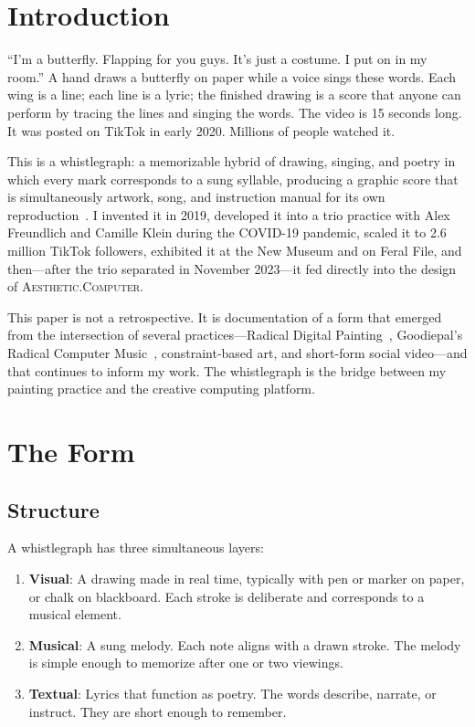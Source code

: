 \documentclass[10pt,letterpaper,twocolumn]{article}
\newcommand{\ac}{\textsc{Aesthetic.Computer}}
\begin{document}
\section{Introduction}

``I'm a butterfly. Flapping for you guys. It's just a costume. I put on in my room.'' A hand draws a butterfly on paper while a voice sings these words. Each wing is a line; each line is a lyric; the finished drawing is a score that anyone can perform by tracing the lines and singing the words. The video is 15 seconds long. It was posted on TikTok in early 2020. Millions of people watched it.

This is a whistlegraph: a memorizable hybrid of drawing, singing, and poetry in which every mark corresponds to a sung syllable, producing a graphic score that is simultaneously artwork, song, and instruction manual for its own reproduction~\citep{dirt2023whistlegraph}. I invented it in 2019, developed it into a trio practice with Alex Freundlich and Camille Klein during the COVID-19 pandemic, scaled it to 2.6 million TikTok followers, exhibited it at the New Museum and on Feral File, and then---after the trio separated in November 2023---it fed directly into the design of \ac{}.

This paper is not a retrospective. It is documentation of a form that emerged from the intersection of several practices---Radical Digital Painting~\citep{scudder2017manifesto}, Goodiepal's Radical Computer Music~\citep{goodiepal2012elcamino}, constraint-based art, and short-form social video---and that continues to inform my work. The whistlegraph is the bridge between my painting practice and the creative computing platform.

\section{The Form}

\subsection{Structure}

A whistlegraph has three simultaneous layers:

\begin{enumerate}
  \item \textbf{Visual}: A drawing made in real time, typically with pen or marker on paper, or chalk on blackboard. Each stroke is deliberate and corresponds to a musical element.
  \item \textbf{Musical}: A sung melody. Each note aligns with a drawn stroke. The melody is simple enough to memorize after one or two viewings.
  \item \textbf{Textual}: Lyrics that function as poetry. The words describe, narrate, or instruct. They are short enough to remember.
\end{enumerate}
\end{document}
